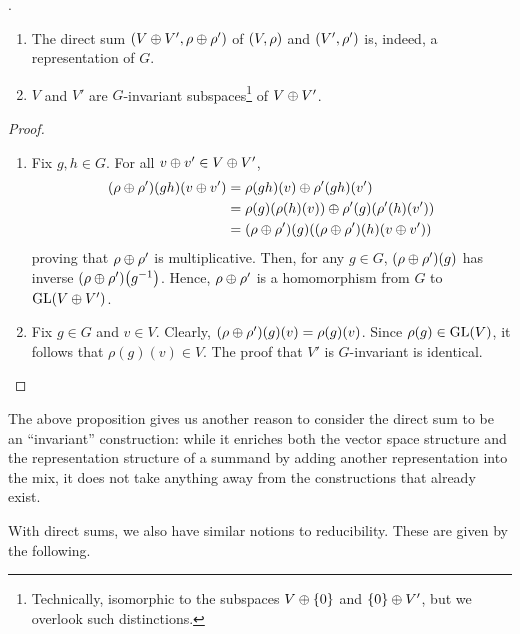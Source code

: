 \begin{proposition}
    .
    \begin{enumerate}[label = \normalfont \arabic*., noitemsep]
        \item The direct sum $\left( V \oplus V', \rho \oplus \rho' \right)$ of $\left( V,\rho \right)$ and $\left( V', \rho' \right)$ is, indeed, a representation of $G$.
        \item $V$ and $V'$ are $G$-invariant subspaces\footnote{Technically, isomorphic to the subspaces $V \oplus \left\{ 0 \right\}$ and $\left\{ 0 \right\} \oplus V'$, but we overlook such distinctions.} of $V \oplus V'$.
    \end{enumerate}
\end{proposition}
\begin{proof}
    \hfill
    \begin{enumerate}[noitemsep]
        \item Fix $g,h \in G$. For all $v \oplus v' \in V \oplus V'$,
        \begin{align*}
            \left( \rho \oplus \rho' \right)\!(gh)(v \oplus v') &= \rho(gh)(v) \oplus \rho'(gh)(v') \\
            &= \rho(g)\!\left( \rho(h)(v) \right) \oplus \rho'(g)\!\left( \rho'(h)(v') \right) \\
            &= \left( \rho \oplus \rho' \right)\!(g)\!\left( \left( \rho \oplus \rho' \right)\!(h)(v \oplus v') \right)
        \end{align*}
        proving that $\rho \oplus \rho'$ is multiplicative. Then, for any $g \in G$, $\left( \rho \oplus \rho' \right)\!(g)$ has inverse $\left( \rho \oplus \rho' \right)\!\left( g^{-1} \right)$. Hence, $\rho \oplus \rho'$ is a homomorphism from $G$ to $\operatorname{GL}\!\left( V \oplus V' \right)$.

        \item Fix $g \in G$ and $v \in V$. Clearly, $\left( \rho \oplus \rho' \right)\!(g)(v) = \rho(g)(v)$. Since $\rho(g) \in \operatorname{GL}\!\left( V \right)$, it follows that $\rho(g)(v) \in V$. The proof that $V'$ is $G$-invariant is identical.
    \end{enumerate}
\end{proof}

The above proposition gives us another reason to consider the direct sum to be an ``invariant'' construction: while it enriches both the vector space structure and the representation structure of a summand by adding another representation into the mix, it does not take anything away from the constructions that already exist.

With direct sums, we also have similar notions to reducibility. These are given by the following.

